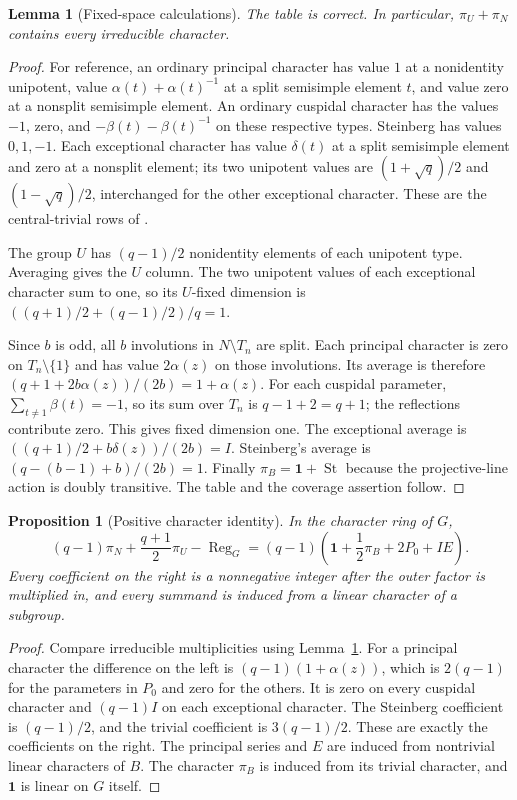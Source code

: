 \documentclass[11pt]{article}
\newtheorem{lemma}[theorem]{Lemma}
\newtheorem{proposition}[theorem]{Proposition}
\theoremstyle{remark}\newtheorem{remark}[theorem]{Remark}
\newcommand{\Reg}{\operatorname{Reg}}
\newcommand{\St}{\operatorname{St}}
\newcommand{\one}{\mathbf 1}
\begin{document}
\begin{lemma}[Fixed-space calculations]\label{lem:fixed}
The table is correct. In particular, $\pi_U+\pi_N$ contains every
irreducible character.
\end{lemma}
\begin{proof}
For reference, an ordinary principal character has value $1$ at a
nonidentity unipotent, value $\alpha(t)+\alpha(t)^{-1}$ at a split
semisimple element $t$, and value zero at a nonsplit semisimple element.
An ordinary cuspidal character has the values $-1$, zero, and
$-\beta(t)-\beta(t)^{-1}$ on these respective types. Steinberg has values
$0,1,-1$. Each exceptional character has value $\delta(t)$ at a split
semisimple element and zero at a nonsplit element; its two unipotent
values are $(1+\sqrt q)/2$ and $(1-\sqrt q)/2$, interchanged for the
other exceptional character. These are the central-trivial rows of
\cite[Table 1]{BFL}.

The group $U$ has $(q-1)/2$ nonidentity elements of each unipotent type.
Averaging gives the $U$ column. The two unipotent values of each
exceptional character sum to one, so its $U$-fixed dimension is
$((q+1)/2+(q-1)/2)/q=1$.

Since $b$ is odd, all $b$ involutions in $N\setminus T_n$ are split.
Each principal character is zero on $T_n\setminus\{1\}$ and has value
$2\alpha(z)$ on those involutions. Its average is therefore
$(q+1+2b\alpha(z))/(2b)=1+\alpha(z)$.
For each cuspidal parameter, $\sum_{t\ne1}\beta(t)=-1$, so its sum over
$T_n$ is $q-1+2=q+1$; the reflections contribute zero. This gives fixed
dimension one. The exceptional average is
$((q+1)/2+b\delta(z))/(2b)=I$.
Steinberg's average is $(q-(b-1)+b)/(2b)=1$.
Finally $\pi_B=\one+\St$ because the projective-line action is doubly
transitive. The table and the coverage assertion follow.
\end{proof}

\begin{proposition}[Positive character identity]\label{prop:identity}
In the character ring of $G$,
\begin{equation}\label{eq:identity}
 (q-1)\pi_N+\frac{q+1}2\pi_U-\Reg_G
 =(q-1)\left(\one+\frac12\pi_B+2P_0+I E\right).
\end{equation}
Every coefficient on the right is a nonnegative integer after the outer
factor is multiplied in, and every summand is induced from a linear
character of a subgroup.
\end{proposition}
\begin{proof}
Compare irreducible multiplicities using Lemma~\ref{lem:fixed}.
For a principal character the difference on the left is
$(q-1)(1+\alpha(z))$, which is $2(q-1)$ for the parameters in $P_0$ and
zero for the others. It is zero on every cuspidal character and
$(q-1)I$ on each exceptional character. The Steinberg coefficient is
$(q-1)/2$, and the trivial coefficient is $3(q-1)/2$.
These are exactly the coefficients on the right.
The principal series and $E$ are induced from nontrivial linear
characters of $B$. The character $\pi_B$ is induced from its trivial
character, and $\one$ is linear on $G$ itself.
\end{proof}
\end{document}
